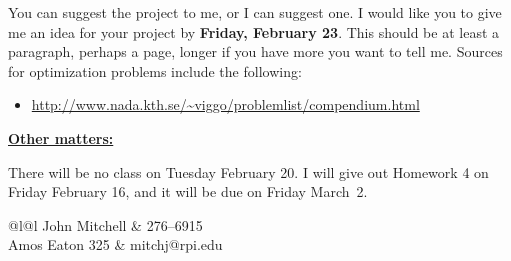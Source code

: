 \documentclass[12pt]{article}
\begin{document}
\noindent
You can suggest the project to me, or I can suggest one.
I would like you to give me an idea for your project by {\bf Friday,
February 23}. This should be at least a paragraph, perhaps a page,
longer if you have more you want to tell me.
Sources for optimization problems include the following:
\begin{itemize}
\item
\noindent
\url{http://www.nada.kth.se/~viggo/problemlist/compendium.html}
\end{itemize}



\begin{flushleft}  \underline{\bf Other matters:}  \end{flushleft}

\noindent
There will be no class on Tuesday February 20.
I will give out Homework 4 on Friday February 16, and it will be due on Friday March~2.


\vfill


\begin{tabular}{@{\hspace{.3in}}l@{\hspace{.5in}}l}
   John Mitchell  &  276--6915  \\
   Amos Eaton 325 &  mitchj@rpi.edu \\
  \\
   \\
\end{tabular}
\end{document}
